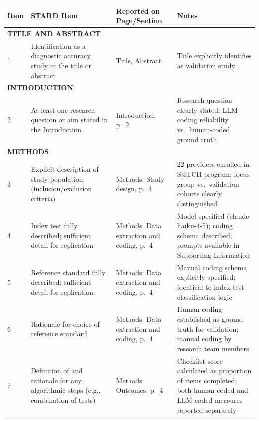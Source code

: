 \documentclass{article}
\begin{document}
\begin{table}[htbp]
\centering
\begin{tabularx}{\textwidth}{|p{0.8cm}|p{5.5cm}|p{6.5cm}|p{3cm}|}
\hline
\textbf{Item} & \textbf{STARD Item} & \textbf{Reported on Page/Section} & \textbf{Notes} \\
\hline

\multicolumn{4}{l}{\textbf{TITLE AND ABSTRACT}} \\
\hline

1 & Identification as a diagnostic accuracy study in the title or abstract & Title, Abstract & Title explicitly identifies as validation study \\
\hline

\multicolumn{4}{l}{\textbf{INTRODUCTION}} \\
\hline

2 & At least one research question or aim stated in the Introduction & Introduction, p.\ 2 & Research question clearly stated: LLM coding reliability vs.\ human-coded ground truth \\
\hline

\multicolumn{4}{l}{\textbf{METHODS}} \\
\hline

3 & Explicit description of study population (inclusion/exclusion criteria) & Methods: Study design, p.\ 3 & 22 providers enrolled in StITCH program; focus group vs.\ validation cohorts clearly distinguished \\
\hline

4 & Index test fully described; sufficient detail for replication & Methods: Data extraction and coding, p.\ 4 & Model specified (claude-haiku-4-5); coding schema described; prompts available in Supporting Information \\
\hline

5 & Reference standard fully described; sufficient detail for replication & Methods: Data extraction and coding, p.\ 4 & Manual coding schema explicitly specified; identical to index test classification logic \\
\hline

6 & Rationale for choice of reference standard & Methods: Data extraction and coding, p.\ 4 & Human coding established as ground truth for validation; manual coding by research team members \\
\hline

7 & Definition of and rationale for any algorithmic steps (e.g., combination of tests) & Methods: Outcomes, p.\ 4 & Checklist score calculated as proportion of items completed; both human-coded and LLM-coded measures reported separately \\
\hline


\end{tabularx}
\end{table}
\end{document}

